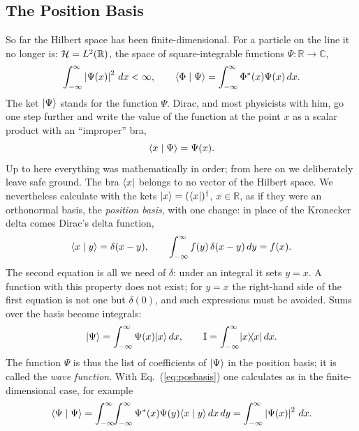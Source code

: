 \subsection{The Position Basis}
So far the Hilbert space has been finite-dimensional. For a particle on the line it no longer is: $\mathcal{H} = L^2(\mathbb{R})$, the space of square-integrable functions $\Psi:\mathbb{R}\to\mathbb{C}$,
\begin{equation}
	\int_{-\infty}^{\infty} \left\lvert \Psi(x) \right\rvert^2\,dx < \infty, \qquad \langle \Phi \mid \Psi \rangle = \int_{-\infty}^{\infty} \Phi^*(x)\Psi(x)\,dx.
\end{equation}
The ket $\lvert \Psi \rangle$ stands for the function $\Psi$. Dirac, and most physicists with him, go one step further and write the value of the function at the point $x$ as a scalar product with an ``improper'' bra,
\begin{equation}
	\langle x \mid \Psi \rangle = \Psi(x).
\end{equation}
Up to here everything was mathematically in order; from here on we deliberately leave safe ground. The bra $\langle x \rvert$ belongs to no vector of the Hilbert space. We nevertheless calculate with the kets $\lvert x \rangle = (\langle x \rvert)^{\dagger}$, $x\in\mathbb{R}$, as if they were an orthonormal basis, the \emph{position basis}, with one change: in place of the Kronecker delta comes Dirac's delta function,
\begin{equation}\label{eq:posbasis}
	\langle x \mid y \rangle = \delta(x-y), \qquad \int_{-\infty}^{\infty} f(y)\,\delta(x-y)\,dy = f(x).
\end{equation}
The second equation is all we need of $\delta$: under an integral it sets $y = x$. A function with this property does not exist; for $y = x$ the right-hand side of the first equation is not one but $\delta(0)$, and such expressions must be avoided. Sums over the basis become integrals:
\begin{equation}\label{eq:posentwicklung}
	\lvert \Psi \rangle = \int_{-\infty}^{\infty} \Psi(x)\lvert x \rangle\,dx, \qquad \mathbb{I} = \int_{-\infty}^{\infty} \lvert x \rangle\!\langle x \rvert\,dx.
\end{equation}
The function $\Psi$ is thus the list of coefficients of $\lvert \Psi \rangle$ in the position basis; it is called the \emph{wave function}. With Eq.~(\ref{eq:posbasis}) one calculates as in the finite-dimensional case, for example
\begin{equation}
	\langle \Psi \mid \Psi \rangle = \int_{-\infty}^{\infty}\!\!\int_{-\infty}^{\infty} \Psi^*(x)\Psi(y)\langle x \mid y \rangle\,dx\,dy = \int_{-\infty}^{\infty} \left\lvert \Psi(x) \right\rvert^2\,dx.
\end{equation}

